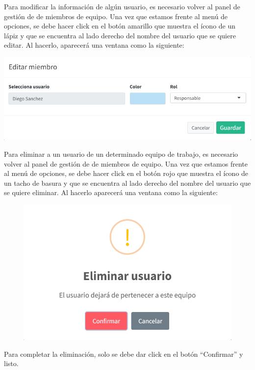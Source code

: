 \documentclass[
  letterpaper,
  DIV=11,
  numbers=noendperiod]{scrreprt}
\begin{document}
Para modificar la información de algún usuario, es necesario volver al
panel de gestión de de miembros de equipo. Una vez que estamos frente al
menú de opciones, se debe hacer click en el botón amarillo que muestra
el ícono de un lápiz y que se encuentra al lado derecho del nombre del
usuario que se quiere editar. Al hacerlo, aparecerá una ventana como la
siguiente:

\includegraphics{./img/manual-admin/Editar miembro.png}

Para eliminar a un usuario de un determinado equipo de trabajo, es
necesario volver al panel de gestión de de miembros de equipo. Una vez
que estamos frente al menú de opciones, se debe hacer click en el botón
rojo que muestra el ícono de un tacho de basura y que se encuentra al
lado derecho del nombre del usuario que se quiere eliminar. Al hacerlo
aparecerá una ventana como la siguiente:

\begin{figure}

{\centering \includegraphics{./img/manual-admin/Eliminar usuario.png}

}

\end{figure}

Para completar la eliminación, solo se debe dar click en el botón
``Confirmar'' y listo.
\end{document}
